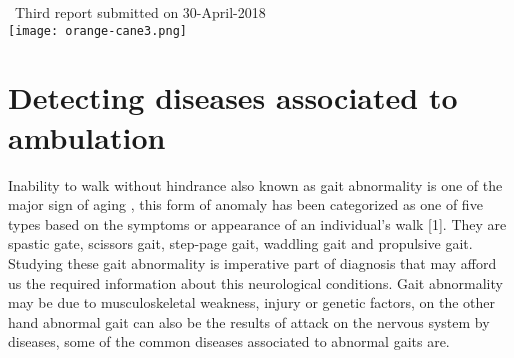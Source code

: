 \documentclass[a4paper, parskip=full]{scrartcl}
\begin{document}
\begin{titlepage}
	
	
	{\large \ Third report submitted on 30-April-2018}\\[0.2cm] %
	
	
	\texttt{[image: orange-cane3.png]}\\[0.2cm] %
	
	
	\vfill %
	
\end{titlepage}







 \section*{Detecting diseases associated to ambulation}
 
Inability to walk without hindrance also known as gait abnormality is one of the major sign of aging , this form of anomaly has been  categorized as one of five types based on the symptoms or appearance of an individual's walk [1]. They are spastic gate, scissors gait, step-page gait, waddling gait and propulsive gait. Studying these gait abnormality is imperative part of diagnosis that may afford us the required information about this neurological conditions. Gait abnormality may be due to musculoskeletal weakness, injury or genetic factors, on the other hand abnormal gait can also be the results of attack on the nervous system by diseases, some of the common diseases associated to abnormal gaits are.
\end{document}
